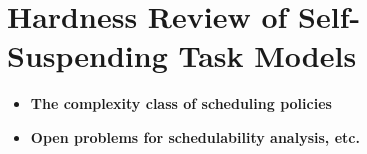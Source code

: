 \section{Hardness Review of Self-Suspending Task Models}
  
\begin{itemize}
\item \textbf{The complexity class of scheduling policies}
\item \textbf{Open problems for schedulability analysis, etc.}
\end{itemize}
  